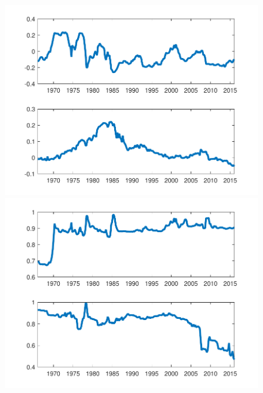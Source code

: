 \documentclass[12pt,reqno]{article}
\numberwithin{equation}{section}
\begin{document}
\begin{figure}[H]
\includegraphics[scale=0.6]{NKPC_ree_init_AR1_alphas.pdf}
\includegraphics[scale=0.6]{NKPC_ree_init_AR1_betas.pdf}

\end{figure}

\newpage
\end{document}
